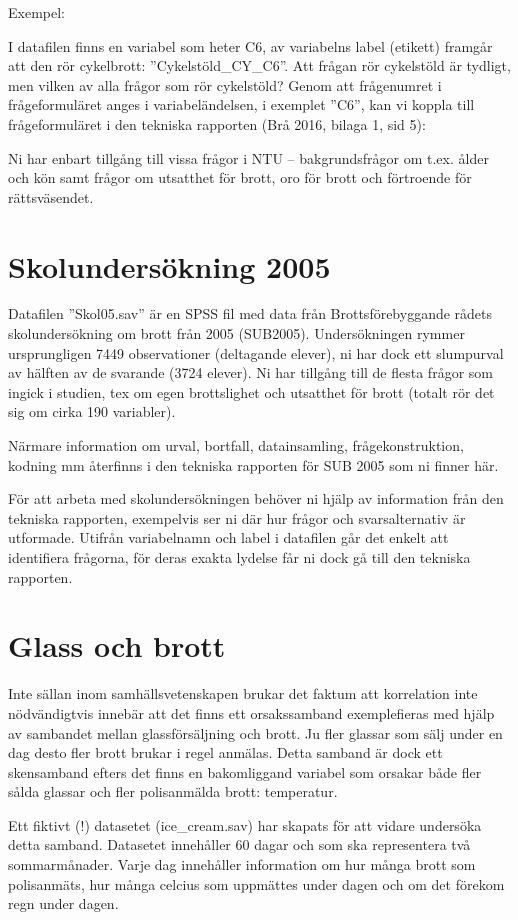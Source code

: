 \documentclass[
]{book}
\begin{document}
Exempel:

I datafilen finns en variabel som heter C6, av variabelns label (etikett) framgår att den rör
cykelbrott: ''Cykelstöld\_CY\_C6''. Att frågan rör cykelstöld är tydligt, men vilken av alla frågor
som rör cykelstöld? Genom att frågenumret i frågeformuläret anges i variabeländelsen, i
exemplet ''C6'', kan vi koppla till frågeformuläret i den tekniska rapporten (Brå 2016, bilaga 1,
sid 5):

Ni har enbart tillgång till vissa frågor i NTU -- bakgrundsfrågor om t.ex. ålder och kön samt
frågor om utsatthet för brott, oro för brott och förtroende för rättsväsendet.

\hypertarget{skolundersuxf6kning-2005}{%
\section{Skolundersökning 2005}\label{skolundersuxf6kning-2005}}

Datafilen ''Skol05.sav'' är en SPSS fil med data från Brottsförebyggande rådets
skolundersökning om brott från 2005 (SUB2005). Undersökningen rymmer ursprungligen 7449
observationer (deltagande elever), ni har dock ett slumpurval av hälften av de svarande (3724
elever). Ni har tillgång till de flesta frågor som ingick i studien, tex om egen brottslighet och
utsatthet för brott (totalt rör det sig om cirka 190 variabler).

Närmare information om urval, bortfall, datainsamling, frågekonstruktion, kodning mm återfinns
i den tekniska rapporten för SUB 2005 som ni finner här.

För att arbeta med skolundersökningen behöver ni hjälp av information från den tekniska
rapporten, exempelvis ser ni där hur frågor och svarsalternativ är utformade. Utifrån variabelnamn och label i datafilen går det enkelt att identifiera frågorna, för deras exakta
lydelse får ni dock gå till den tekniska rapporten.

\hypertarget{glass-och-brott}{%
\section{Glass och brott}\label{glass-och-brott}}

Inte sällan inom samhällsvetenskapen brukar det faktum att korrelation inte nödvändigtvis innebär att det finns ett orsakssamband exemplefieras med hjälp av sambandet mellan glassförsäljning och brott. Ju fler glassar som sälj under en dag desto fler brott brukar i regel anmälas. Detta samband är dock ett skensamband efters det finns en bakomliggand variabel som orsakar både fler sålda glassar och fler polisanmälda brott: temperatur.

Ett fiktivt (!) datasetet (ice\_cream.sav) har skapats för att vidare undersöka detta samband. Datasetet innehåller 60 dagar och som ska representera två sommarmånader. Varje dag innehåller information om hur många brott som polisanmäts, hur många celcius som uppmättes under dagen och om det förekom regn under dagen.

  
\end{document}
